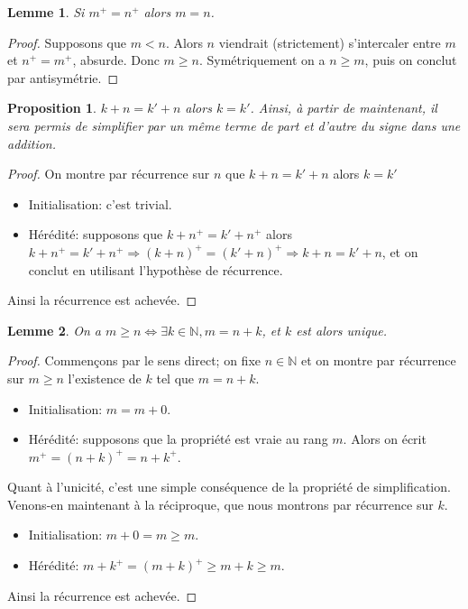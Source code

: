 \documentclass[french]{book}
\theoremstyle{plain}
\newtheorem{lem}{Lemme}[chapter]
\newtheorem{prop}{Proposition}[chapter]
\theoremstyle{definition}
\theoremstyle{remark}
\begin{document}
\begin{lem}
	Si $m^{+} = n^{+}$ alors $m = n$.
\end{lem}
\begin{proof}
	Supposons que $m < n$. Alors $n$ viendrait (strictement) s'intercaler entre $m$
et $n^{+} = m^{+}$, absurde. Donc $m \geqslant n$. Symétriquement on a $n \geqslant m$, puis on conclut par antisymétrie.
\end{proof}
\begin{prop}
	$k + n = k' + n$ alors $k = k'$. Ainsi, à partir de maintenant, il sera permis de simplifier par un même terme de part et d'autre du signe dans une addition.
\end{prop}
\begin{proof}
	On montre par récurrence sur $n$ que $k + n = k' + n$ alors $k = k'$
\begin{itemize}
	\item Initialisation: c'est trivial.
	\item Hérédité: supposons que $k + n^{+} = k' + n^{+}$ alors
	$k + n^{+} = k' + n^{+} \Rightarrow (k + n)^{+} = (k' + n)^{+} \Rightarrow k + n = k' + n$, et on conclut en utilisant l'hypothèse de récurrence.
\end{itemize}
Ainsi la récurrence est achevée.
\end{proof}
\begin{lem}
	On a $m \geqslant n\iff\exists k \in \mathbb{N}, m = n + k$, et $k$ est alors unique.
\end{lem}
\begin{proof}
	Commençons par le sens direct; on fixe $n \in \mathbb{N}$ et on montre par récurrence sur $m \geqslant n$ l'existence de $k$ tel que $m = n + k$.
	\begin{itemize}
		\item Initialisation: $m = m + 0$.
		\item Hérédité: supposons que la propriété est vraie au rang $m$. Alors on écrit $m^{+} = (n + k)^{+} = n + k^{+}$.
	\end{itemize}
	Quant à l'unicité, c'est une simple conséquence de la propriété de simplification. Venons-en maintenant à la réciproque, que nous montrons par récurrence sur $k$.
	\begin{itemize}
		\item Initialisation: $m + 0 = m \geqslant m$.
		\item Hérédité: $m + k^+ = (m + k)^+ \geqslant m + k \geqslant m$.
	\end{itemize}
	Ainsi la récurrence est achevée.
\end{proof}
\end{document}
